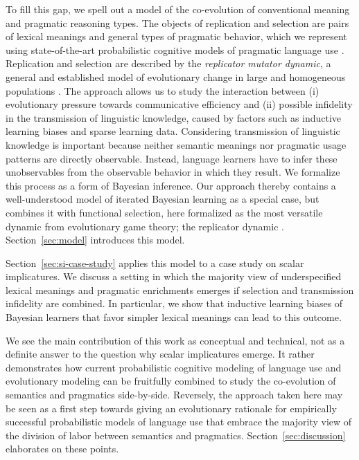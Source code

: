 \documentclass[a4paper]{article}
\begin{document}
To fill this gap, we spell out a model of the co-evolution of conventional meaning and
pragmatic reasoning types. The objects of replication and selection are pairs of lexical
meanings and general types of pragmatic behavior, which we represent using state-of-the-art
probabilistic cognitive models of pragmatic language use
\citep{frank+goodman:2012,FrankeJager2015:Probabilistic-p,GoodmanFrank2016:Pragmatic-Langu}. Replication
and selection are described by the \emph{replicator mutator dynamic}, a general and established
model of evolutionary change in large and homogeneous populations
\citep{Hofbauer1985:The-Selection-M,nowak+etal:2000,NowakKomarova2001:Evolution-of-Un,hofbauer+sigmund:2003,Nowak2006:Evolutionary-Dy}. The
approach allows us to study the interaction between (i) evolutionary pressure towards
communicative efficiency and (ii) possible infidelity in the transmission of linguistic
knowledge, caused by factors such as inductive learning biases and sparse learning data. Considering
transmission of linguistic knowledge is important because neither semantic meanings nor
pragmatic usage patterns are directly observable. Instead, language learners have to infer these
unobservables from the observable behavior in which they result. We formalize this 
process as a form of Bayesian inference. Our approach thereby contains a well-understood model
of iterated Bayesian learning \citep{griffiths+kalish:2007} as a special case, but combines it
with functional selection, here formalized as the most versatile dynamic from evolutionary game
theory; the replicator dynamic
\citep{TaylorJonker1978:Evolutionary-St}. Section~\ref{sec:model} introduces this model.

Section~\ref{sec:si-case-study} applies this model to a case study on scalar implicatures. We
discuss a setting in which the majority view of underspecified lexical meanings and pragmatic
enrichments emerges if selection and transmission infidelity are combined. In particular, we
show that inductive learning biases of Bayesian learners that favor simpler lexical meanings
can lead to this outcome. 

We see the main contribution of this work as conceptual and technical, not as a definite answer
to the question why scalar implicatures emerge. It rather demonstrates how current
probabilistic cognitive modeling of language use and evolutionary modeling can be fruitfully
combined to study the co-evolution of semantics and pragmatics side-by-side. Reversely, the
approach taken here may be seen as a first step towards giving an evolutionary rationale for
empirically successful probabilistic models of language use that embrace the majority view of
the division of labor between semantics and pragmatics. Section~\ref{sec:discussion} elaborates
on these points.
\end{document}
